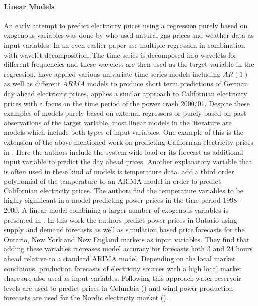 \paragraph{Linear Models}
An early attempt to predict electricity prices using a regression purely based on exogenous variables was done by \cite{schmutz_electricity_2004} who used natural gas prices and weather data as input variables. In an even earlier paper \cite{kim_prediction_2002} use multiple regression in combination with wavelet decomposition. The time series is decomposed into wavelets for different frequencies and these wavelets are then used as the target variable in the regression.
 \cite{crespo_cuaresma_forecasting_2004} have applied various univariate time series models including $AR(1)$ as well as different $ARMA$ models to produce short term predictions of German day ahead electricity prices. \cite{weron_forecasting_2005} applies a similar approach to Californian electricity prices with a focus on the time period of the power crash 2000/01.  
Despite these examples of models purely based on external regressors or purely based on past observations of the target variable, most linear models in the literature are models which include both types of input variables.
One example of this is the extension of the above mentioned work on predicting Californian electricity prices in \cite{misiorek_point_2006}. Here the authors include the system wide load or its forecast as additional input variable to predict the day ahead prices. Another explanatory variable that is often used in these kind of models is temperature data. \cite{knittel_empirical_2005} add a third order polynomial of the temperature to an ARIMA model in order to predict Californian electricity prices. The authors find the temperature variables to be highly significant in a model predicting power prices in the time period 1998-2000.  A linear model combining a larger number of exogenous variables is presented in \cite{zareipour_application_2006}. In this work the authors predict power prices in Ontario using supply and demand forecasts as well as simulation based price forecasts for the Ontario, New York and New England markets as input variables. They find that adding these variables increases model accuracy for forecasts both 3 and 24 hours ahead relative to a standard ARIMA model. Depending on the local market conditions, production forecasts of electricity sources  with a high local market share are also used as input variables. Following this approach water reservoir levels are used to predict prices in Columbia (\cite{lira_short-term_2009}) and wind power production forecasts are used for the Nordic electricity market (\cite{kristiansen_forecasting_2012}).

